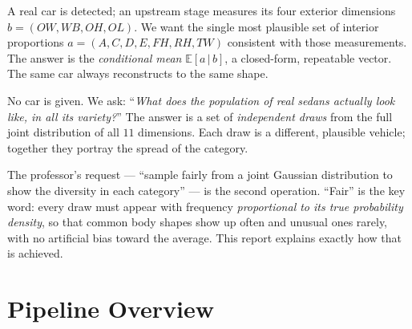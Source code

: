 \documentclass[11pt]{article}
\newcommand{\OL}{\mathit{OL}}
\newcommand{\OW}{\mathit{OW}}
\newcommand{\OH}{\mathit{OH}}
\newcommand{\WB}{\mathit{WB}}
\newcommand{\TW}{\mathit{TW}}
\newcommand{\FH}{\mathit{FH}}
\newcommand{\RH}{\mathit{RH}}
\newcommand{\given}{\,\vert\,}
\theoremstyle{definition}
\begin{document}
\begin{description}[leftmargin=1.5em, style=nextline]
  \item[Reconstruction (deterministic).] A real car is detected; an upstream stage measures its four exterior dimensions $b=(\OW,\WB,\OH,\OL)$. We want the single most plausible set of interior proportions $a=(A,C,D,E,\FH,\RH,\TW)$ consistent with those measurements. The answer is the \emph{conditional mean} $\mathbb{E}[a\given b]$, a closed-form, repeatable vector. The same car always reconstructs to the same shape.
  \item[Fair sampling (stochastic).] No car is given. We ask: ``\emph{What does the population of real sedans actually look like, in all its variety?}'' The answer is a set of \emph{independent draws} from the full joint distribution of all $11$ dimensions. Each draw is a different, plausible vehicle; together they portray the spread of the category.
\end{description}

\noindent The professor's request --- ``sample fairly from a joint Gaussian distribution to show the diversity in each category'' --- is the second operation. ``Fair'' is the key word: every draw must appear with frequency \emph{proportional to its true probability density}, so that common body shapes show up often and unusual ones rarely, with no artificial bias toward the average. This report explains exactly how that is achieved.

\section{Pipeline Overview}
\end{document}
